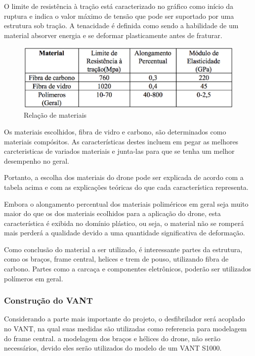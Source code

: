 O limite de resistência à tração está caracterizado no gráfico como início da ruptura e indica o valor máximo de tensão que pode ser suportado por uma estrutura sob tração.
A tenacidade é definida como sendo a habilidade de um material absorver energia e se deformar plasticamente antes de fraturar.

\begin{figure}[h!]
    \centering
      \includegraphics[keepaspectratio=true,scale=0.5]{figuras/graficoRelacao.eps}
    \caption{ Relação de materiais}
    \label{fig:graficoRelacao}
\end{figure}

Os materiais escolhidos, fibra de vidro e carbono, são determinados como materiais compósitos. As características destes incluem em pegar as melhores carcteristicas de variados materiais e junta-las para que se tenha um melhor desempenho no geral. 

Portanto, a escolha dos materiais do drone pode ser explicada de acordo com a tabela acima e com as explicações teóricas do que cada característica representa. 

Embora o alongamento percentual dos materiais poliméricos em geral seja muito maior do que os dos materiais ecolhidos para a aplicação do drone, esta característica é exibida no domínio plástico, ou seja, o material não se romperá mais perderá a qualidade devido a uma quantidade significativa de deformação.

Como conclusão do material a ser utilizado, é interessante partes da estrutura, como os braços, frame central, helices e trem de pouso, utilizando fibra de carbono. Partes como a carcaça e componentes eletrônicos, poderão ser utilizados polímeros em geral. 

\subsubsection{Construção do VANT}

Considerando a parte mais importante do projeto, o desfibrilador será acoplado no VANT, na qual suas medidas são utilizadas como referencia para modelagem do frame central. a modelagem dos  braços e hélices do drone, não serão necessários, devido eles serão utilizados do modelo de um VANT S1000.

